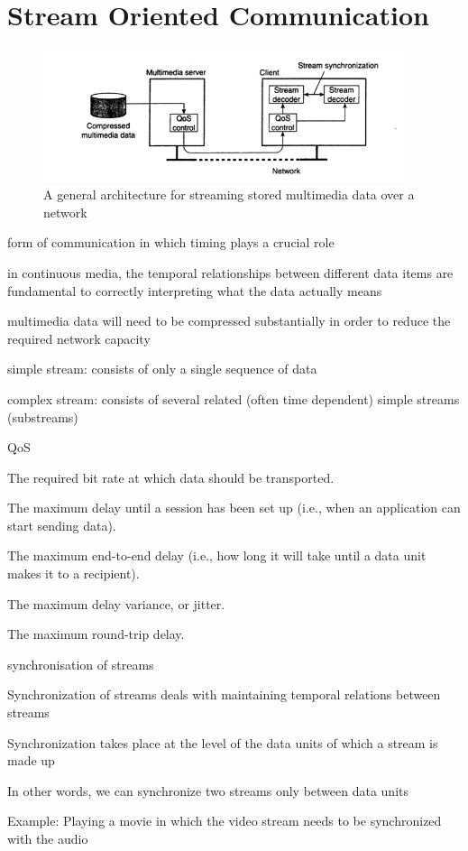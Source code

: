 \documentclass[ngerman,a4paper]{report}
\begin{document}
\section{Stream Oriented Communication}

\begin{figure}[h]
	\centering
	\includegraphics[width=400px]{gfx/streams.png}
	\caption{A general architecture for streaming stored multimedia data over a network}
	\label{img:streams}
\end{figure}

\begin{compactitem}
	\item form of communication in which timing plays a crucial role
	\item in continuous media, the temporal relationships between different data items are fundamental to correctly interpreting what the data actually means
	\item multimedia data will need to be compressed substantially in order to reduce the required network capacity
	\item simple stream: consists of only a single sequence of data
	\item complex stream: consists of several related (often time dependent) simple streams (substreams)
	\item QoS
		\begin{compactenum}
			\item The required bit rate at which data should be transported. 
			\item The maximum delay until a session has been set up (i.e., when an application can start sending data). 
			\item The maximum end-to-end delay (i.e., how long it will take until a data unit makes it to a recipient). 
			\item The maximum delay variance, or jitter. 
			\item The maximum round-trip delay.		
		\end{compactenum}

	\item synchronisation of streams
	\begin{compactitem}
		\item Synchronization of streams deals with maintaining temporal relations between streams
		\item Synchronization takes place at the level of the data units of which a stream is made up
		\item In other words, we can synchronize two streams only between data units
		\item Example: Playing a movie in which the video stream needs to be synchronized with the audio
	\end{compactitem}
	
\end{compactitem}
\end{document}
